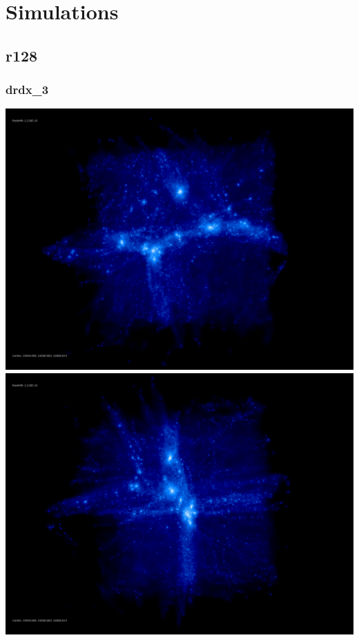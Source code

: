 \chapter{Simulations} 


\section{r128} 

\subsection{drdx\_3} 

\includegraphics[scale=0.12]{r128/h100/drdx_3/rotate_00185.jpg} 
\includegraphics[scale=0.12]{r128/h100/drdx_3/rotate_00136.jpg} 

